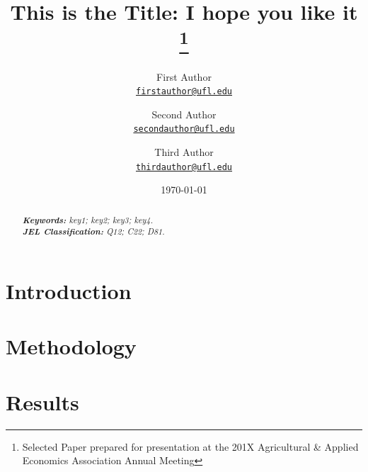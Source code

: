 \documentclass[11pt]{article}
\title{This is the Title: I hope you like it
\thanks{Selected Paper prepared for presentation at the 201X Agricultural \& Applied Economics Association Annual Meeting}
}
\author{First Author\\%
    \href{mailto:firstauthor@ufl.edu}{\texttt{firstauthor@ufl.edu}} %
\and Second Author\\%
    \href{mailto:secondauthor@ufl.edu}{\texttt{secondauthor@ufl.edu}} %
\and Third Author\\%
    \href{mailto:thirdauthor@ufl.edu}{\texttt{thirdauthor@ufl.edu}}%
    }
\date{\today}
\begin{document}
{
\maketitle
\begin{abstract}

\lipsum[1] %

\noindent
\textit{\textbf{Keywords: }%
key1; key2; key3; key4.} \\ %
\noindent
\textit{\textbf{JEL Classification: }%
Q12; C22; D81.} %

\end{abstract}
}


\section{Introduction}

\lipsum[2-5] %
\citet{Hardaker2004} %

\section{Methodology}

\lipsum[7-9] %
\citep{Chavas2015} %

\section{Results}

\lipsum[12-13] %
\end{document}
